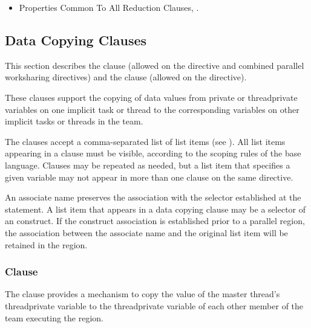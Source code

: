 \crossreferences
\begin{itemize}
\item Properties Common To All Reduction Clauses,
.
\end{itemize}



\subsection{Data Copying Clauses}
\label{subsec:Data Copying Clauses}
This section describes the  clause (allowed on the  directive and
combined parallel worksharing directives) and the  clause (allowed on
the  directive).

These clauses support the copying of data values from private or threadprivate variables
on one implicit task or thread to the corresponding variables on other implicit tasks or
threads in the team.

The clauses accept a comma-separated list of list items (see ).
All list items appearing in a clause must be visible, according to the scoping rules of the
base language. Clauses may be repeated as needed, but a list item that specifies a given
variable may not appear in more than one clause on the same directive.

\begin{fortranspecific}
An associate name preserves the association with the selector established at the  statement. A list item that appears in a data copying clause may be a selector of an  construct. If the construct association is established prior to a parallel region, the association between the associate name and the original list item will be retained in the region.
\end{fortranspecific}







\subsubsection{ Clause}
\label{subsubsec:copyin clause}
\summary
The  clause provides a mechanism to copy the value of the master thread's
threadprivate variable to the threadprivate variable of each other member of the team
executing the  region.

